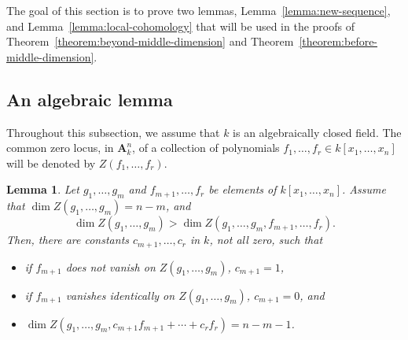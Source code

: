 \documentclass{amsart}
\numberwithin{equation}{section}
\theoremstyle{plain}
\newtheorem{lemma}[equation]{Lemma}
\theoremstyle{definition}
\renewcommand{\mathbb}{\mathbf}
\begin{document}
The goal of this section is to prove two lemmas,
Lemma~\ref{lemma:new-sequence}, and Lemma~\ref{lemma:local-cohomology}
that will be used in the proofs of
Theorem~\ref{theorem:beyond-middle-dimension} and
Theorem~\ref{theorem:before-middle-dimension}.

\subsection*{An algebraic lemma}
Throughout this subsection, we assume that \(k\) is an algebraically closed field.
The common zero locus, in \(\mathbb{A}_{k}^n\), of a collection of polynomials
\(f_1,\ldots,f_r \in k[x_1,\ldots,x_n]\) will be denoted by
\(Z(f_1,\ldots,f_r)\).


\begin{lemma}%
\label{lemma:recombination}
Let \(g_{1},\ldots,g_{m}\) and \(f_{m+1},\ldots,f_{r}\) be elements
of \(k[x_{1},\ldots,x_{n}]\).  Assume that
\(\dim Z(g_1,\ldots,g_m) = n-m\), and
\begin{equation}
\label{eq:inductive-hypo}
\dim Z(g_1,\ldots, g_m) > \dim Z(g_1,\ldots, g_m, f_{m+1}, \ldots, f_r).
\end{equation}
Then, there are constants \(c_{m+1}, \ldots, c_r\) in \(k\), not all zero, such that
\begin{itemize}
\item if \(f_{m+1}\) does not vanish on \(Z(g_1,\ldots,g_m)\), \(c_{m+1}=1\),
\item if \(f_{m+1}\) vanishes identically on \(Z(g_1,\ldots,g_m)\),
\(c_{m+1}=0\), and
\item \(\dim Z(g_1,\ldots, g_m, c_{m+1}f_{m+1}+ \cdots + c_rf_r) = n - m -1\).
\end{itemize}
\end{lemma}
\end{document}
